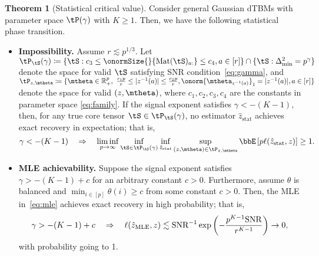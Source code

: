 \documentclass[lettersize,onecolumn,journal]{IEEEtran}
\theoremstyle{definition}
\newtheorem{thm}{Theorem}
\theoremstyle{definition}
\begin{document}
\begin{thm}[Statistical critical value]\label{thm:stats} Consider general Gaussian dTBMs with parameter space $\tP(\gamma)$ with $K\geq 1$. Then, we have the following statistical phase transition. 

\begin{itemize}[wide]
    \item { \color{blue}
    \textbf{Impossibility.}  Assume $r\lesssim p^{1/3}$. Let $\tP_{\tS}(\gamma) \coloneqq \{ \tS: c_3\leq \onormSize{}{\text{Mat}(\tS)_{a:}}\leq c_4, a\in[r]\} \cap \{ \tS: \Delta_{\min}^2 = p^{\gamma}\}$ denote the space for valid $\tS$ satisfying SNR condition~\eqref{eq:gamma}, and $\tP_{z ,\mtheta} \coloneqq \{ \mtheta\in\mathbb{R}^p_{+},\ 
{c_1p\over r}\leq |z^{-1}(a)|\leq {c_2 p\over r}, \onorm{\mtheta_{z^{-1}(a)}}_1=|z^{-1}(a)|, a \in [r] \}$ denote the space for valid $(z, \mtheta)$,  where $c_1, c_2, c_3, c_4$ are the constants in parameter space \eqref{eq:family}. If the signal exponent satisfies $\gamma < -(K-1)$, then, for any true core tensor $\tS \in \tP_{\tS}(\gamma)$, no estimator $\hat z_{\text{stat}}$ achieves exact recovery in expectation; that is,
    \begin{equation}\label{eq:minminmax}
  \gamma< -(K-1) \quad \Rightarrow  \quad \liminf_{p \rightarrow \infty}\inf_{\tS \in  \tP_{\tS}(\gamma)}  \inf_{\hat z_{\text{stat}}}\sup_{ (z, \mtheta) \in \tP_{z, \mtheta}} \bbE \left[ p\ell(\hat z_{\text{stat}}, z) \right]\geq 1.
\end{equation}
    }
    
\item \textbf{MLE achievability.} Suppose the signal exponent satisfies $\gamma >-(K-1)+c$ for an arbitrary constant $c>0$. Furthermore, assume $\theta$ is balanced and $\min_{i\in[p]}\theta(i)\geq c$ from some constant $c>0$. Then, the MLE in~\eqref{eq:mle} achieves exact recovery in high probability; that is,
\begin{equation}
\gamma> -(K-1)+c \quad  \Rightarrow  \quad \ell(\hat z_{\text{MLE}}, z) \lesssim \text{SNR}^{-1}\exp\left(-{p^{K-1}\text{SNR}\over r^{K-1}}\right) \to 0,
\end{equation}
with probability going to 1. 
\end{itemize}
\end{thm}
\end{document}
